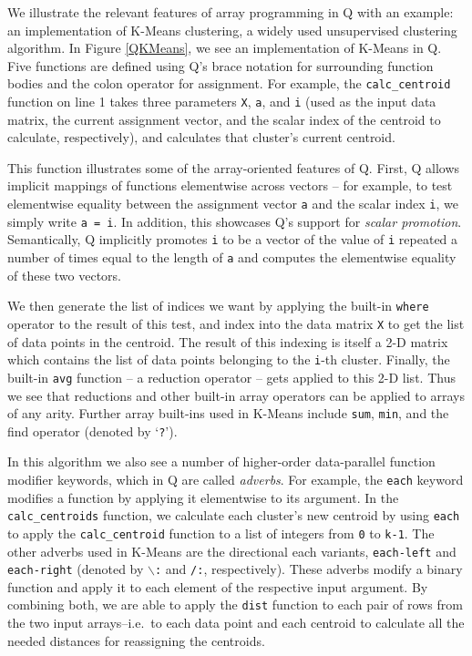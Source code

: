 \documentclass[preprint]{sigplanconf}
\begin{document}
We illustrate the relevant features of array programming in Q with an example: an implementation of K-Means clustering, a widely used unsupervised clustering algorithm.  In Figure \ref{QKMeans}, we see an implementation of K-Means in Q.  Five functions are defined using Q's brace notation for surrounding function bodies and the colon operator for assignment. For example, the \texttt{calc\_centroid} function on line 1 takes three parameters \texttt{X}, \texttt{a}, and \texttt{i} (used as the input data matrix, the
current assignment vector, and the scalar index of the centroid to calculate, respectively), and calculates that cluster's current centroid.

This function illustrates some of the array-oriented features of Q. First, Q allows implicit mappings of functions elementwise across vectors -- for example, to test elementwise equality between the assignment
vector \texttt{a} and the scalar index \texttt{i}, we simply write \texttt{a = i}.  In addition, this showcases Q's support for \emph{scalar promotion}.  Semantically, Q implicitly promotes \texttt{i} to be a vector of the value of \texttt{i} repeated a number of times equal to the length of \texttt{a} and computes the elementwise equality of these two vectors.

We then generate the list of indices we want by applying the built-in \texttt{where} operator to the result of this test, and index into the data matrix \texttt{X} to get the list of data points in the centroid. The result of this indexing is itself a 2-D matrix which contains the list of data points belonging to the \texttt{i}-th cluster. Finally, the built-in \texttt{avg} function -- a reduction operator -- gets applied to this 2-D list. Thus we see that reductions and other built-in array operators can be applied to arrays of any arity.  Further array built-ins used in K-Means include \texttt{sum}, \texttt{min}, and the find operator (denoted by `\texttt{?}').

In this algorithm we also see a number of higher-order data-parallel function modifier keywords, which in Q are called \emph{adverbs}.  For example, the \texttt{each} keyword modifies a function by applying it elementwise to its argument.  In the \texttt{calc\_centroids} function, we calculate each cluster's
new centroid by using \texttt{each} to apply the \texttt{calc\_centroid} function to a list of integers from \texttt{0} to \texttt{k-1}.  The other adverbs used in K-Means are the directional each variants, \texttt{each-left} and \texttt{each-right} (denoted by \texttt{$\backslash$:} and  \texttt{/:}, respectively). These adverbs modify a binary function and apply it to each element of the respective input argument.  By combining both, we are able to apply the \texttt{dist} function to each pair of rows from the two input arrays--i.e.~to each data point and each centroid to calculate all the needed distances for reassigning the centroids.
\end{document}
